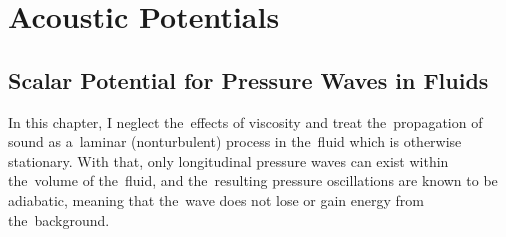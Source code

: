 


\section{Acoustic Potentials}

\subsection{Scalar Potential for Pressure Waves in Fluids}

In this chapter, I neglect the~effects of viscosity and treat the~propagation of sound as a~laminar (nonturbulent) process in the~fluid which is otherwise stationary.
With that, only longitudinal pressure waves can exist within the~volume of the~fluid, and the~resulting pressure oscillations are known to be adiabatic, meaning that the~wave does not lose or gain energy from the~background.

